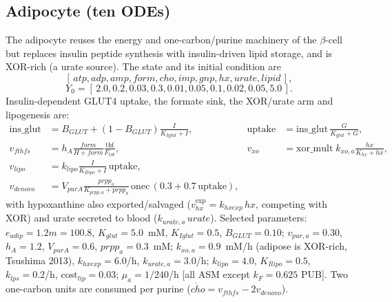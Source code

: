 \documentclass[11pt]{article}
\begin{document}
\subsection{Adipocyte (ten ODEs)}
The adipocyte reuses the energy and one-carbon/\allowbreak purine machinery of the
$\beta$-cell but replaces insulin peptide synthesis with insulin-driven lipid
storage, and is XOR-rich (a urate source). The state and its initial condition are
\[
[\,atp,adp,amp,form,cho,imp,gnp,hx,urate,lipid\,],
\]
\[
Y_0=[\,2.0,0.2,0.03,0.3,0.01,0.05,0.1,0.02,0.05,5.0\,].
\]
Insulin-dependent GLUT4 uptake, the formate sink, the XOR/\allowbreak urate arm and
lipogenesis are:
\begin{align}
\mathrm{ins\_glut}&=B_{GLUT}+(1-B_{GLUT})\tfrac{I}{K_{Iglut}+I}, &
\mathrm{uptake}&=\mathrm{ins\_glut}\,\tfrac{G}{K_{glut}+G},\\
v_{fthfs}&=h_A\tfrac{form}{H+form}\tfrac{\mathrm{thf}}{F_{tot}}, &
v_{xo}&=\mathrm{xor\_mult}\;k_{xo,a}\tfrac{hx}{K_{hx}+hx},\\
v_{lipo}&=k_{lipo}\tfrac{I}{K_{Ilipo}+I}\,\mathrm{uptake},\\
v_{denovo}&=V_{purA}\tfrac{prpp_a}{K_{prpp,a}+prpp_a}\,\mathrm{onec}\,(0.3+0.7\,\mathrm{uptake}),
\end{align}
with hypoxanthine also exported/salvaged ($v_{hx}^{\mathrm{exp}}=k_{hxexp}\,hx$,
competing with XOR) and urate secreted to blood ($k_{urate,a}\,urate$). Selected
parameters: $e_{adip}=1.2m=100.8$, $K_{glut}=5.0$~mM, $K_{Iglut}=0.5$,
$B_{GLUT}=0.10$; $v_{pur,a}=0.30$, $h_A=1.2$, $V_{purA}=0.6$, $prpp_a=0.3$~mM;
$k_{xo,a}=0.9$~mM/h (adipose is XOR-rich, Tsushima 2013), $k_{hxexp}=6.0$/h,
$k_{urate,a}=3.0$/h; $k_{lipo}=4.0$, $K_{Ilipo}=0.5$, $k_{lps}=0.2$/h,
$\mathrm{cost}_{lip}=0.03$; $\mu_a=1/240$/h [all ASM except $k_F=0.625$ PUB]. Two
one-carbon units are consumed per purine ($\dot{cho}=v_{fthfs}-2v_{denovo}$).
\end{document}
